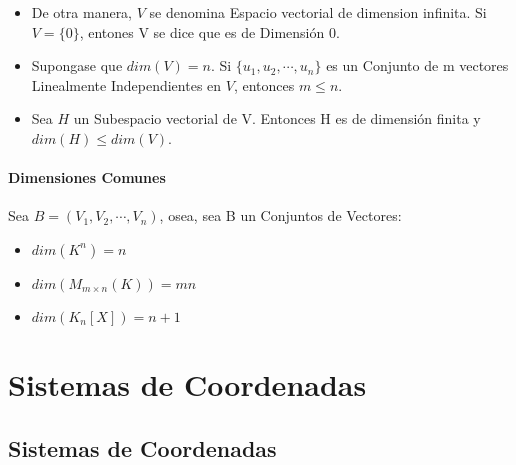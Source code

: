 \documentclass[12pt]{report}                                %
\begin{document}
        \begin{itemize}
            \item De otra manera, $V$ se denomina Espacio vectorial de dimension infinita.
            Si $V=\{0\}$, entones V se dice que es de Dimensión 0.

            \item Supongase que $dim(V) = n$. Si $\{u_1, u_2, \cdots, u_n\}$ es un Conjunto de m vectores
            Linealmente Independientes en $V$, entonces $m \leq n$.

            \item Sea $H$ un Subespacio vectorial de V. Entonces H es de dimensión finita
            y $dim(H) \leq dim(V)$.

        \end{itemize}


        \subsubsection{Dimensiones Comunes}
        Sea $ B = (V_1, V_2, \cdots, V_n)$, osea, sea B un Conjuntos de Vectores:

        \begin{itemize}
            \item $dim(K^n) = n$
            \item $dim(M_{m \times n}(K)) = mn$
            \item $dim(K_{n}{[X]}) = n + 1$
        \end{itemize}


\chapter{Sistemas de Coordenadas}
    \clearpage

    \section{Sistemas de Coordenadas}
\end{document}
